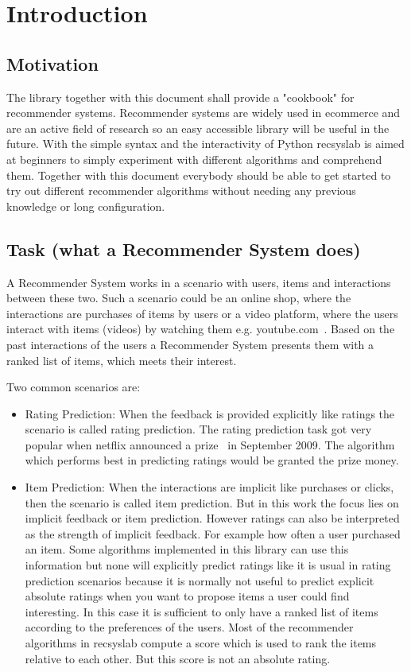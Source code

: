 \chapter{Introduction}


\section{Motivation}

The library together with this document shall provide a "cookbook"
for recommender systems. Recommender systems are widely used in ecommerce
and are an active field of research so an easy accessible library will be 
useful in the future.
With the simple syntax and the interactivity
of Python recsyslab is aimed at beginners to simply experiment with different
algorithms and comprehend them. Together with this document everybody
should be able to get started to try out different recommender algorithms
without needing any previous knowledge or long configuration.


\section{Task (what a Recommender System does)}

A Recommender System works in a scenario with users, items and interactions
between these two. Such a scenario could be an online shop,
where the interactions are purchases of items by users or a video
platform, where the users interact with items (videos) by watching
them e.g. youtube.com~\cite{youtube}. Based on the past interactions of the users
a Recommender System presents them with a ranked list of items, which meets their interest.

Two common scenarios are:
\begin{itemize}
    \item Rating Prediction:
When the feedback is provided explicitly like ratings the scenario is called rating prediction. 
The rating prediction task got very popular when netflix announced a prize~\cite{netflixprize}
in September 2009. The algorithm which performs best in predicting ratings 
would be granted the prize money.
    \item Item Prediction:
When the interactions are implicit like purchases or clicks, then the
scenario is called item prediction. But in this work the focus lies on implicit feedback or item prediction.
However ratings can also be interpreted as the strength of implicit feedback.
For example how often a user purchased an item. Some algorithms implemented
in this library can use this information but none will explicitly
predict ratings like it is usual in rating prediction scenarios because
it is normally not useful to predict explicit absolute ratings when
you want to propose items a user could find interesting. In this case
it is sufficient to only have a ranked list of items according to the 
preferences of the users. Most of the recommender algorithms in recsyslab
compute a score which is used to rank the items relative to each other.
But this score is not an absolute rating.
\end{itemize}


